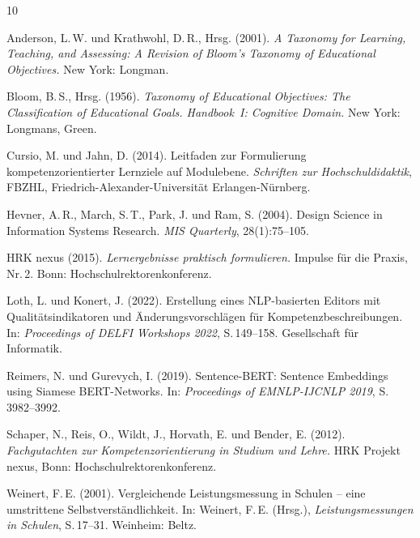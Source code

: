 \documentclass[12pt,a4paper]{article}
\begin{document}
\begin{thebibliography}{10}

Anderson, L.\,W. und Krathwohl, D.\,R., Hrsg. (2001).
\textit{A Taxonomy for Learning, Teaching, and Assessing: A Revision of Bloom's Taxonomy of Educational Objectives.}
New York: Longman.

Bloom, B.\,S., Hrsg. (1956).
\textit{Taxonomy of Educational Objectives: The Classification of Educational Goals. Handbook~I: Cognitive Domain.}
New York: Longmans, Green.

Cursio, M. und Jahn, D. (2014).
Leitfaden zur Formulierung kompetenzorientierter Lernziele auf Modulebene.
\textit{Schriften zur Hochschuldidaktik}, FBZHL, Friedrich-Alexander-Universit\"at Erlangen-N\"urnberg.

Hevner, A.\,R., March, S.\,T., Park, J. und Ram, S. (2004).
Design Science in Information Systems Research.
\textit{MIS Quarterly}, 28(1):75--105.

{HRK nexus} (2015).
\textit{Lernergebnisse praktisch formulieren.}
Impulse f\"ur die Praxis, Nr.\,2. Bonn: Hochschulrektorenkonferenz.

Loth, L. und Konert, J. (2022).
Erstellung eines NLP-basierten Editors mit Qualit\"atsindikatoren und \"Anderungsvorschl\"agen f\"ur Kompetenzbeschreibungen.
In: \textit{Proceedings of DELFI Workshops 2022}, S.\,149--158. Gesellschaft f\"ur Informatik.

Reimers, N. und Gurevych, I. (2019).
Sentence-BERT: Sentence Embeddings using Siamese BERT-Networks.
In: \textit{Proceedings of EMNLP-IJCNLP 2019}, S.\,3982--3992.

Schaper, N., Reis, O., Wildt, J., Horvath, E. und Bender, E. (2012).
\textit{Fachgutachten zur Kompetenzorientierung in Studium und Lehre.}
HRK Projekt nexus, Bonn: Hochschulrektorenkonferenz.

Weinert, F.\,E. (2001).
Vergleichende Leistungsmessung in Schulen -- eine umstrittene Selbstverst\"andlichkeit.
In: Weinert, F.\,E. (Hrsg.), \textit{Leistungsmessungen in Schulen}, S.\,17--31. Weinheim: Beltz.

\end{thebibliography}
\end{document}

